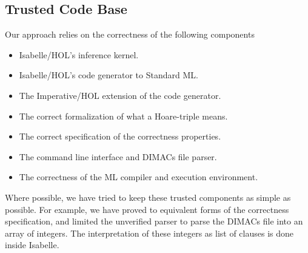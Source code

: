 \documentclass{llncs}     %
\begin{document}
\subsection{Trusted Code Base}
Our approach relies on the correctness of the following components
\begin{itemize}
  \item Isabelle/HOL's inference kernel.
  \item Isabelle/HOL's code generator to Standard ML.
  \item The Imperative/HOL extension of the code generator.
  \item The correct formalization of what a Hoare-triple means.
  \item The correct specification of the correctness properties.
  \item The command line interface and DIMACs file parser.
  \item The correctness of the ML compiler and execution environment.
\end{itemize}

Where possible, we have tried to keep these trusted components as simple as possible.
For example, we have proved to equivalent forms of the correctness specification,
and limited the unverified parser to parse the DIMACs file into an array of integers.
The interpretation of these integers as list of clauses is done inside Isabelle.
\end{document}
